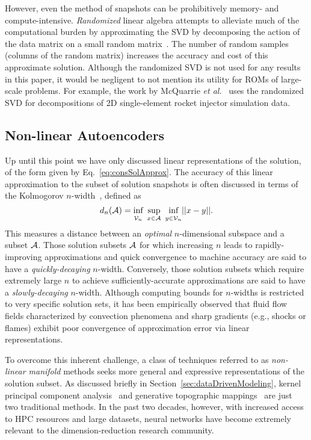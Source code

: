However, even the method of snapshots can be prohibitively memory- and compute-intensive. \textit{Randomized} linear algebra attempts to alleviate much of the computational burden by approximating the SVD by decomposing the action of the data matrix on a small random matrix~\cite{Halko2011}. The number of random samples (columns of the random matrix) increases the accuracy and cost of this approximate solution. Although the randomized SVD is not used for any results in this paper, it would be negligent to not mention its utility for ROMs of large-scale problems. For example, the work by McQuarrie \textit{et al.}~\cite{McQuarrie2021} uses the randomized SVD for decompositions of 2D single-element rocket injector simulation data.


\subsection{Non-linear Autoencoders}\label{subsec:nonlinManifold}

Up until this point we have only discussed linear representations of the solution, of the form given by Eq.~\ref{eq:consSolApprox}. The accuracy of this linear approximation to the subset of solution snapshots is often discussed in terms of the Kolmogorov $n$-width~\cite{Pinkus1985}, defined as
%
\begin{equation}\label{eq:nwidth}
    d_n(\mathcal{A}) = \underset{\mathcal{V}_n}{\vphantom{sup}\text{inf}} \enspace \underset{x \in \mathcal{A}}{\text{sup}} \enspace \underset{y \in \mathcal{V}_n}{\vphantom{sup}\text{inf}} || x - y ||.
\end{equation}
%
This measures a distance between an \textit{optimal} $n$-dimensional subspace and a subset $\mathcal{A}$. Those solution subsets $\mathcal{A}$ for which increasing $n$ leads to rapidly-improving approximations and quick convergence to machine accuracy are said to have a \textit{quickly-decaying} $n$-width. Conversely, those solution subsets which require extremely large $n$ to achieve sufficiently-accurate approximations are said to have a \textit{slowly-decaying} $n$-width. Although computing bounds for $n$-widths is restricted to very specific solution sets, it has been empirically observed that fluid flow fields characterized by convection phenomena and sharp gradients (e.g., shocks or flames) exhibit poor convergence of approximation error via linear representations.

To overcome this inherent challenge, a class of techniques referred to as \textit{non-linear manifold} methods seeks more general and expressive representations of the solution subset. As discussed briefly in Section~\ref{sec:dataDrivenModeling}, kernel principal component analysis~\cite{kernelPCA} and generative topographic mappings~\cite{Bishop1997} are just two traditional methods. In the past two decades, however, with increased access to HPC resources and large datasets, neural networks have become extremely relevant to the dimension-reduction research community. 

